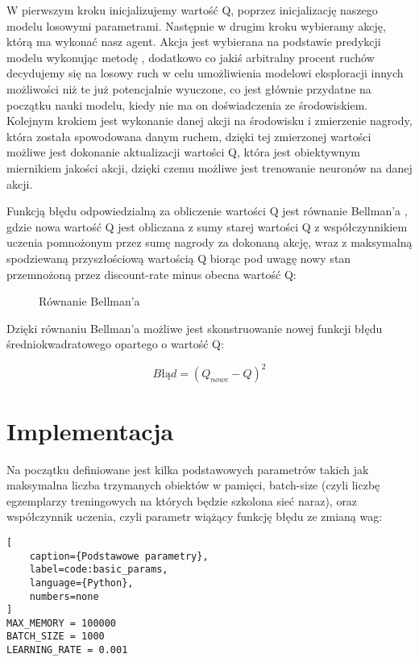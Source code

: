 W pierwszym kroku inicjalizujemy wartość Q, poprzez inicjalizację naszego modelu losowymi parametrami. Następnie w drugim kroku wybieramy akcję, którą ma wykonać nasz agent. Akcja jest wybierana na podstawie predykcji modelu wykonując metodę , dodatkowo co jakiś arbitralny procent ruchów decydujemy się na losowy ruch w celu umożliwienia modelowi eksploracji innych możliwości niż te już potencjalnie wyuczone, co jest głównie przydatne na początku nauki modelu, kiedy nie ma on doświadczenia ze środowiskiem. Kolejnym krokiem jest wykonanie danej akcji na środowisku i zmierzenie nagrody, która została spowodowana danym ruchem, dzięki tej zmierzonej wartości możliwe jest dokonanie aktualizacji wartości Q, która jest obiektywnym miernikiem jakości akcji, dzięki czemu możliwe jest trenowanie neuronów na danej akcji.

Funkcją błędu odpowiedzialną za obliczenie wartości Q jest równanie Bellman'a \cite{BellmanEquation}, gdzie nowa wartość Q jest obliczana z sumy starej wartości Q z współczynnikiem uczenia pomnożonym przez sumę nagrody za dokonaną akcję, wraz z maksymalną spodziewaną przyszłościową wartością Q biorąc pod uwagę nowy stan przemnożoną przez discount-rate minus obecna wartość Q:


\begin{figure}[h]
    \centering
    \caption{Równanie Bellman'a \cite{BellmanEquationPic}}
    \label{img:bellman_eq}
\end{figure}

Dzięki równaniu Bellman'a możliwe jest skonstruowanie nowej funkcji błędu średniokwadratowego \cite{BladSredniokwadratowy} opartego o wartość Q:

$$
    Błąd = (Q_{nowe} - Q)^{2}
$$

\clearpage

\section{Implementacja}


Na początku definiowane jest kilka podstawowych parametrów takich jak maksymalna liczba trzymanych obiektów w pamięci, batch-size \cite{BatchNormalization} (czyli liczbę egzemplarzy treningowych na których będzie szkolona sieć naraz), oraz współczynnik uczenia, czyli parametr wiążący funkcję błędu ze zmianą wag:

\begin{onepage}
    \begin{lstlisting}[
    caption={Podstawowe parametry},
    label=code:basic_params,
    language={Python},
    numbers=none
]
MAX_MEMORY = 100000
BATCH_SIZE = 1000
LEARNING_RATE = 0.001
    \end{lstlisting}
\end{onepage}


